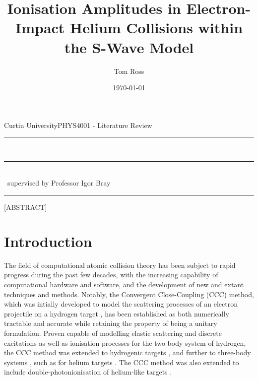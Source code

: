 \documentclass[draft]{article}
\title{Ionisation Amplitudes in Electron-Impact Helium Collisions within the
  S-Wave Model}
\author{Tom Ross}
\date{\today}
\gdef\theassessment{PHYS4001 - Literature Review}
\gdef\thesupervisor{Professor Igor Bray}
\gdef\theinstitution{Curtin University}
\begin{document}

\begin{titlepage}
  \begin{flushleft}
    \theinstitution \hfill \theassessment
  \end{flushleft}
  \hrule
  \begin{center}
    {\huge\thetitle}
    \\
    \rule[1.0pt]{8.5cm}{0.4pt}
    \\
    {\large \theauthor ~supervised by \thesupervisor}
  \end{center}
  \hrule
  \begin{center}
    [ABSTRACT]
  \end{center}
\end{titlepage}

\clearpage


\tableofcontents

\listoffigures

\listoftables


\clearpage

\section{Introduction}
\label{sec:introduction}

The field of computational atomic collision theory has been subject to rapid
progress during the past few decades, with the increasing capability of
computational hardware and software, and the development of new and extant
techniques and methods.
Notably, the Convergent Close-Coupling (CCC) method, which was intially
developed to model the scattering processes of an electron projectile on a
hydrogen target \cite{PhysRevA.46.6995}, has been established as both
numerically tractable and accurate while retaining the property of being a
unitary formulation.
Proven capable of modelling elastic scattering and discrete excitations
\cite{PhysRevA.46.6995} as well as ionisation processes
\cite{PhysRevLett.70.746, PhysRevLett.78.4721, PhysRevLett.83.1570} for the
two-body system of hydrogen, the CCC method was extended to hydrogenic targets
\cite{PhysRevA.49.1066}, and further to three-body systems
\cite{PhysRevLett.69.53, BRAY19951, PhysRevLett.89.273201}, such as for
helium targets \cite{PhysRevA.52.1279, PhysRevLett.76.2674, Fursa_1997}.
The CCC method was also extended to include double-photonionisation of
helium-like targets \cite{PhysRevA.54.R995, PhysRevA.58.4501, Bray_2002}.
\end{document}
